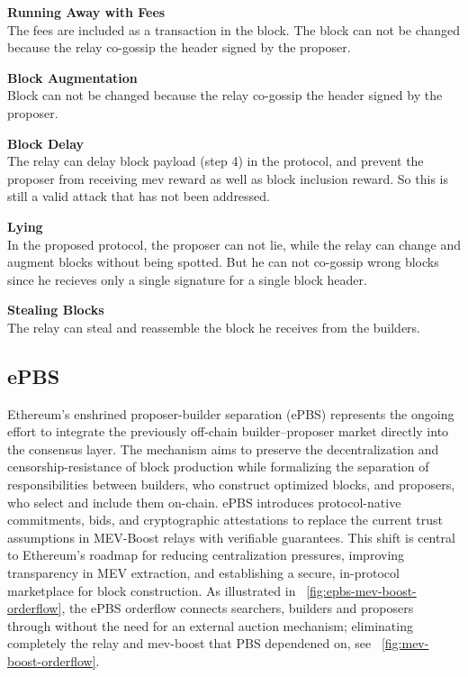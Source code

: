 \noindent\textbf{Running Away with Fees}\\[4pt]
The fees are included as a transaction in the block. The block can not be changed because the relay co-gossip the header signed by the proposer.

\noindent\textbf{Block Augmentation}\\[4pt]
Block can not be changed because the relay co-gossip the header signed by the proposer.

\noindent\textbf{Block Delay}\\[4pt]
The relay can delay block payload (step 4) in the protocol, and prevent the proposer from receiving mev reward as well as block inclusion reward. So this is still a valid attack that has not been addressed.

\noindent\textbf{Lying}\\[4pt] In the proposed protocol, the proposer can not lie, while the relay can change and augment blocks without being spotted. But he can not co-gossip wrong blocks since he recieves only a single signature for a single block header.

\noindent\textbf{Stealing Blocks}\\[4pt]
The relay can steal and reassemble the block he receives from the builders.


\subsection{ePBS}
Ethereum’s enshrined proposer-builder separation (ePBS) represents the ongoing effort to integrate the previously off-chain builder–proposer market directly into the consensus layer. The mechanism aims to preserve the decentralization and censorship-resistance of block production while formalizing the separation of responsibilities between builders, who construct optimized blocks, and proposers, who select and include them on-chain. ePBS introduces protocol-native commitments, bids, and cryptographic attestations to replace the current trust assumptions in MEV-Boost relays with verifiable guarantees. This shift is central to Ethereum’s roadmap for reducing centralization pressures, improving transparency in MEV extraction, and establishing a secure, in-protocol marketplace for block construction.  As illustrated in ~\ref{fig:epbs-mev-boost-orderflow}, the ePBS orderflow connects searchers, builders and proposers through without the need for an external auction mechanism; eliminating completely the relay and mev-boost that PBS dependened on, see ~\ref{fig:mev-boost-orderflow}.


